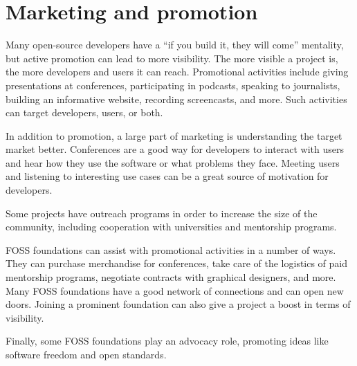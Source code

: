 


\chapter{Marketing and promotion}

Many open-source developers have a ``if you build it, they will come'' mentality, but active promotion can lead to more visibility.  The more visible a project is, the more developers and users it can reach.  Promotional activities include giving presentations at conferences, participating in podcasts, speaking to journalists, building an informative website, recording screencasts, and more.  Such activities can target developers, users, or both.

In addition to promotion, a large part of marketing is understanding the target market better.  Conferences are a good way for developers to interact with users and hear how they use the software or what problems they face.  Meeting users and listening to interesting use cases can be a great source of motivation for developers.

Some projects have outreach programs in order to increase the size of the community, including cooperation with universities and mentorship programs.

FOSS foundations can assist with promotional activities in a number of ways.  They can purchase merchandise for conferences, take care of the logistics of paid mentorship programs, negotiate contracts with graphical designers, and more.  Many FOSS foundations have a good network of connections and can open new doors.  Joining a prominent foundation can also give a project a boost in terms of visibility.

Finally, some FOSS foundations play an advocacy role, promoting ideas like software freedom and open standards.

